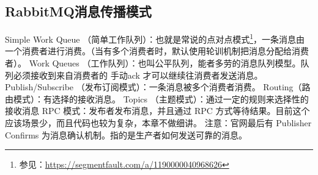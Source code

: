 \documentclass[../../../interview-questions.tex]{subfiles}
\begin{document}
\subsection{RabbitMQ消息传播模式}

Simple Work Queue （简单工作队列）：也就是常说的点对点模式\footnote{参见：\url{https://segmentfault.com/a/1190000040968626}}，一条消息由一个消费者进行消费。（当有多个消费者时，默认使用轮训机制把消息分配给消费者）。
Work Queues （工作队列）：也叫公平队列，能者多劳的消息队列模型。队列必须接收到来自消费者的   手动ack 才可以继续往消费者发送消息。
Publish/Subscribe （发布订阅模式）：一条消息被多个消费者消费。
Routing（路由模式）：有选择的接收消息。
Topics （主题模式）：通过一定的规则来选择性的接收消息
RPC 模式：发布者发布消息，并且通过 RPC 方式等待结果。目前这个应该场景少，而且代码也较为复杂，本章不做细讲。
注意：官网最后有 Publisher Confirms 为消息确认机制。指的是生产者如何发送可靠的消息。
\end{document}
